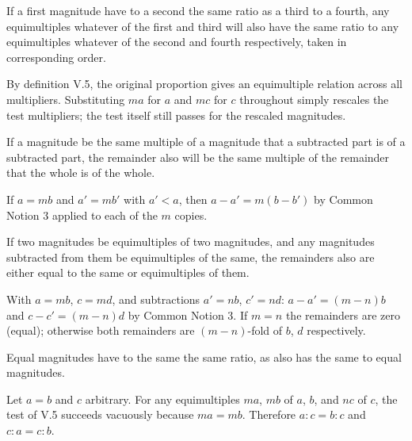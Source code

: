 \begin{claim}
\label{prop:V.4}
If a first magnitude have to a second the same ratio as a third to a
fourth, any equimultiples whatever of the first and third will also
have the same ratio to any equimultiples whatever of the second and
fourth respectively, taken in corresponding order.
\end{claim}
\begin{evidence}[Proof of V.4]
\label{ev:V.4}
By definition V.5, the original proportion gives an equimultiple
relation across all multipliers.  Substituting $m a$ for $a$ and $m c$
for $c$ throughout simply rescales the test multipliers; the test
itself still passes for the rescaled magnitudes.
\end{evidence}

\begin{claim}
\label{prop:V.5}
If a magnitude be the same multiple of a magnitude that a subtracted
part is of a subtracted part, the remainder also will be the same
multiple of the remainder that the whole is of the whole.
\end{claim}
\begin{evidence}[Proof of V.5]
\label{ev:V.5}
If $a = mb$ and $a' = mb'$ with $a' < a$, then $a - a' = m(b - b')$
by Common Notion 3 applied to each of the $m$ copies.
\end{evidence}

\begin{claim}
\label{prop:V.6}
If two magnitudes be equimultiples of two magnitudes, and any
magnitudes subtracted from them be equimultiples of the same, the
remainders also are either equal to the same or equimultiples of them.
\end{claim}
\begin{evidence}[Proof of V.6]
\label{ev:V.6}
With $a = mb$, $c = md$, and subtractions $a' = nb$, $c' = nd$:
$a - a' = (m-n)b$ and $c - c' = (m-n)d$ by Common Notion 3.  If $m = n$
the remainders are zero (equal); otherwise both remainders are
$(m-n)$-fold of $b$, $d$ respectively.
\end{evidence}

\begin{claim}
\label{prop:V.7}
Equal magnitudes have to the same the same ratio, as also has the
same to equal magnitudes.
\end{claim}
\begin{evidence}[Proof of V.7]
\label{ev:V.7}
Let $a = b$ and $c$ arbitrary.  For any equimultiples $ma$, $mb$ of
$a$, $b$, and $nc$ of $c$, the test of V.5 succeeds vacuously because
$ma = mb$.  Therefore $a:c = b:c$ and $c:a = c:b$.
\end{evidence}

